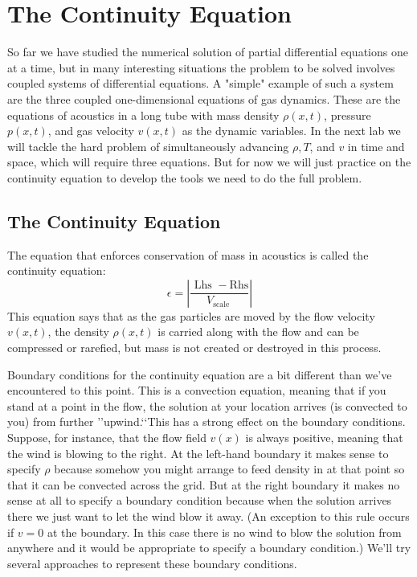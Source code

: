 
\chapter*{The Continuity Equation}
So far we have studied the numerical solution of partial differential equations one at a time, but in many interesting situations the problem to be solved involves coupled systems of differential equations. A "simple" example of such a system are the three coupled one-dimensional equations of gas dynamics. These are the equations of acoustics in a long tube with mass density $\rho(x, t)$, pressure $p(x, t)$, and gas velocity $v(x, t)$ as the dynamic variables. In the next lab we will tackle the hard problem of simultaneously advancing $\rho, T$, and $v$ in time and space, which will require three equations. But for now we will just practice on the continuity equation to develop the tools we need to do the full problem.
\section*{The Continuity Equation}
The equation that enforces conservation of mass in acoustics is called the continuity equation:
\begin{equation}\label{eq:101}
\epsilon=\left|\frac{\text { Lhs }-\mathrm{Rhs}}{V_{\text {scale }}}\right|
\end{equation}
This equation says that as the gas particles are moved by the flow velocity $v(x, t)$, the density $\rho(x, t)$ is carried along with the flow and can be compressed or rarefied, but mass is not created or destroyed in this process.

Boundary conditions for the continuity equation are a bit different than we\rq ve encountered to this point. This is a convection equation, meaning that if you stand at a point in the flow, the solution at your location arrives (is convected to you) from further \rq\rq upwind.\lq\lq This has a strong effect on the boundary conditions. Suppose, for instance, that the flow field $v(x)$ is always positive, meaning that the wind is blowing to the right. At the left-hand boundary it makes sense to specify $\rho$ because somehow you might arrange to feed density in at that point so that it can be convected across the grid. But at the right boundary it makes no sense at all to specify a boundary condition because when the solution arrives there we just want to let the wind blow it away. (An exception to this rule occurs if $v=0$ at the boundary. In this case there is no wind to blow the solution from anywhere and it would be appropriate to specify a boundary condition.) We\rq ll try several approaches to represent these boundary conditions.

